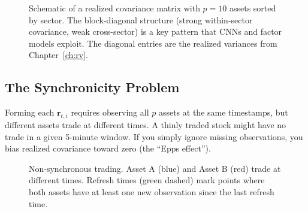 \begin{figure}[ht]
\caption{Schematic of a realized covariance matrix with $p = 10$ assets sorted
by sector. The block-diagonal structure (strong within-sector covariance, weak
cross-sector) is a key pattern that CNNs and factor models exploit. The diagonal
entries are the realized variances from Chapter~\ref{ch:rv}.}
\label{fig:rc-heatmap}
\end{figure}

\subsection{The Synchronicity Problem}

Forming each $\mathbf{r}_{t,i}$ requires observing all $p$ assets at the same
timestamps, but different assets trade at different times. A
thinly traded stock might have no trade in a given 5-minute window. If you
simply ignore missing observations, you bias realized covariance toward zero
(the ``Epps effect'').

\begin{figure}[ht]
\centering
{}
\caption{Non-synchronous trading. Asset A (blue) and Asset B (red) trade at
different times. Refresh times (green dashed) mark points where both assets
have at least one new observation since the last refresh time.}
\label{fig:nonsync}
\end{figure}

